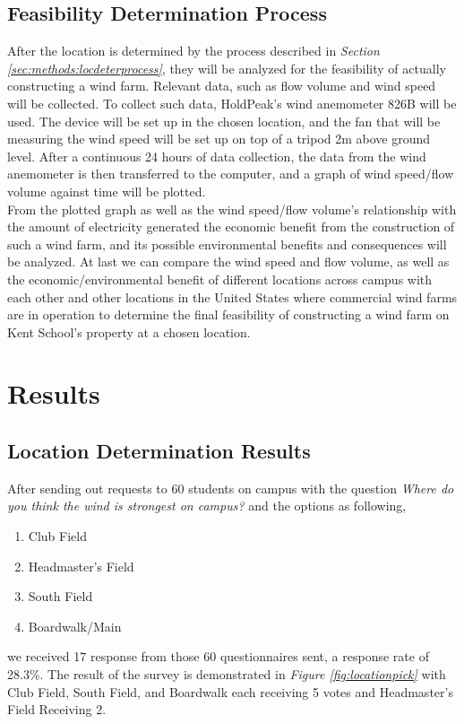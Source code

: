 \documentclass[review]{elsarticle}
\begin{document}
\subsection{Feasibility Determination Process}
\label{sec:methods:feasdeterprocess}
After the location is determined by the process described in \textit{Section \ref{sec:methods:locdeterprocess}}, they will be analyzed for the feasibility of actually constructing 
a wind farm. Relevant data, such as flow volume and wind speed will be collected. To collect such data, HoldPeak's wind anemometer 826B will 
be used. The device will be set up in the chosen location, and the fan that will be measuring the wind speed will be set up on top of a tripod 
2m above ground level. After a continuous 24 hours of data collection, the data from the wind anemometer is then transferred to the computer, 
and a graph of wind speed/flow volume against time will be plotted.
\\\indent From the plotted graph as well as the wind speed/flow volume's relationship with the amount of electricity generated the economic 
benefit from the construction of such a wind farm, and its possible environmental benefits and consequences will be analyzed. At last we can 
compare the wind speed and flow volume, as well as the economic/environmental benefit of different locations across campus with each other 
and other locations in the United States where commercial wind farms are in operation to determine the final feasibility of constructing a 
wind farm on Kent School's property at a chosen location.



\section{Results}
\label{sec:results}
\subsection{Location Determination Results}
\label{sec:results:locdeterresults}
After sending out requests to 60 students on campus with the question \textit{Where do you think the wind is strongest on campus?} and the options as following,
\begin{enumerate}
    \item {Club Field}
    \item {Headmaster's Field}
    \item {South Field}
    \item {Boardwalk/Main}   
\end{enumerate}
we received 17 response from those 60 questionnaires sent, a response rate of 28.3\%. The result of the survey is demonstrated in 
\textit{Figure \ref{fig:locationpick}} with Club Field, South Field, and Boardwalk each receiving 5 votes and Headmaster's Field Receiving 2.
\end{document}
